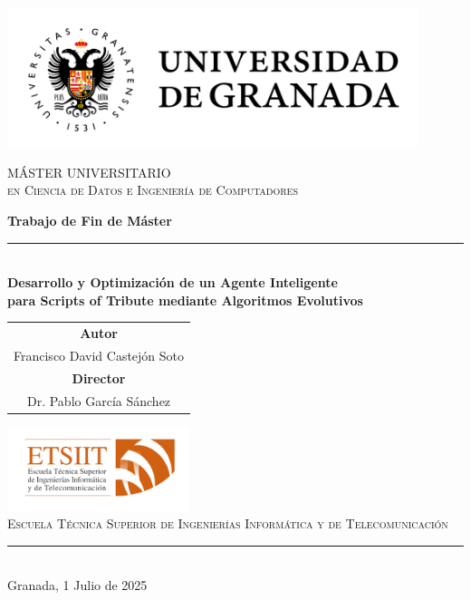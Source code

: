 \begin{titlepage}
	\thispagestyle{empty}

	\centering
	\includegraphics[width=0.9\textwidth]{logos/logo_ugr.jpg}
	\vspace{1.0cm}

	{\rmfamily\textsc{\Large MÁSTER UNIVERSITARIO}}\\[0.2cm]
	{\rmfamily\textsc{\large en Ciencia de Datos e Ingeniería de Computadores}}
	\vspace{1.5cm}

	\vfill

	{\Huge\bfseries Trabajo de Fin de Máster}\\[0.5cm]
	\rule{\textwidth}{3pt}\\[0.5cm]
	{\Large\bfseries Desarrollo y Optimización de un Agente Inteligente \\
	para Scripts of Tribute mediante Algoritmos Evolutivos}
	\vspace{1.5cm}

	\vfill

	\begin{tabular}{@{}c@{}}
		\textbf{\large Autor}         \\[0.3cm]
		Francisco David Castejón Soto \\[1cm]
		\textbf{\large Director}      \\[0.3cm]
		Dr. Pablo García Sánchez
	\end{tabular}

	\vfill

	\includegraphics[width=0.4\textwidth]{logos/etsiit_logo.png}\\[0.3cm]
	{\rmfamily\textsc{\footnotesize Escuela Técnica Superior de Ingenierías Informática y de Telecomunicación}}\\
	\rule{0.1\textwidth}{0.5pt}\\[0.3cm]
	{\large Granada, 1 Julio de 2025}

\end{titlepage}